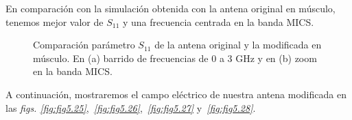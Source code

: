 \clearpage

En comparación con la simulación obtenida con la antena original en músculo, tenemos mejor valor de $S_{11}$ y una frecuencia centrada en la banda MICS.

\begin{figure}[!htb]
    \centering
    \caption{Comparación parámetro $S_{11}$ de la antena original y la modificada en músculo. En (a) barrido de frecuencias de 0 a 3 GHz y en (b) zoom en la banda MICS.}
    \label{fig:fig5.24}
\end{figure}

\clearpage

A continuación, mostraremos el campo eléctrico de nuestra antena modificada en las \textit{figs. \ref{fig:fig5.25}},~\textit{\ref{fig:fig5.26}},~\textit{\ref{fig:fig5.27}} y~\textit{\ref{fig:fig5.28}}.

